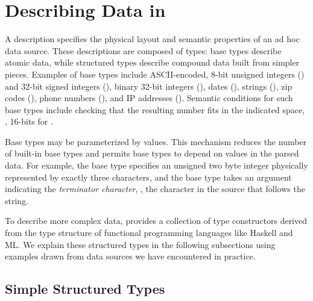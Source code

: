 \section{Describing Data in \padsmlbig{}}
\label{sec:padsml-overview}

A \padsml{} description specifies the physical layout and semantic
properties of an ad hoc data source.  These descriptions are composed
of types: base types describe atomic data, while structured types
describe compound data built from simpler pieces.  Examples of base
types include ASCII-encoded, 8-bit unsigned integers () and
32-bit signed integers (), binary 32-bit integers (),
dates (), strings (), zip codes (),
phone numbers (), and IP addresses ().  Semantic
conditions for such base types include checking 
that the resulting number fits in the indicated space, \ie, 16-bits
for .

Base types may be parameterized by \ml{} values.  This mechanism
reduces the number of built-in base types and permits base types to
depend on values in the parsed data.  For example, the base type
 specifies an unsigned two byte integer physically
represented by exactly three characters, and the base type
 takes an argument indicating the \textit{terminator
character}, \ie{}, the character in the source that
follows the string.

To describe more complex data, \padsml{} provides a collection of type
constructors derived from the type structure of functional programming
languages like Haskell and ML.  We explain these structured types in
the following subsections using examples drawn from data sources we
have encountered in practice.


\subsection{Simple Structured Types}


